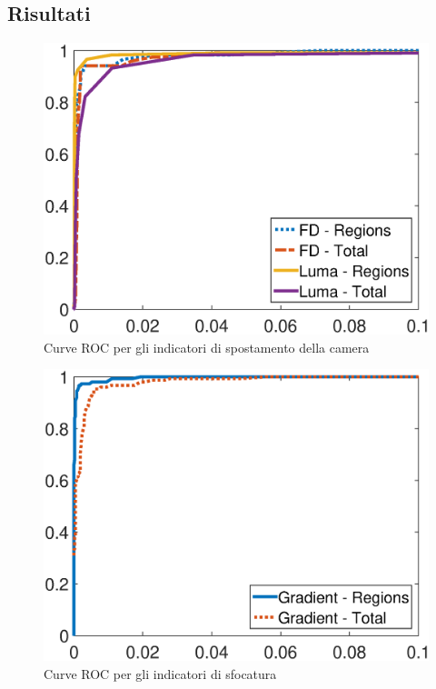 \subsection{Risultati}
\begin{figure}[tb]
	\centering
	\includegraphics[width=13cm]{diagrammi/ROC_displacement}
	\caption{Curve ROC per gli indicatori di spostamento della camera}
	\label{fig:ROC_displacement}
\end{figure}
%
\begin{figure}[tb]
	\centering
	\includegraphics[width=13cm]{diagrammi/ROC_defocus}
	\caption{Curve ROC per gli indicatori di sfocatura}
	\label{fig:ROC_defocus}
\end{figure}
